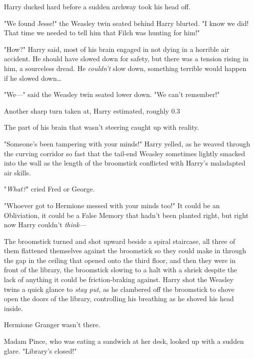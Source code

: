 Harry ducked hard before a sudden archway took his head off.

"We found Jesse!" the Weasley twin seated behind Harry blurted. "I know we did! That time we needed to tell him that Filch was hunting for him!"

"How?" Harry said, most of his brain engaged in not dying in a horrible air accident. He should have slowed down for safety, but there was a tension rising in him, a sourceless dread. He \emph{couldn't} slow down, something terrible would happen if he slowed down{\ldots}

"We---" said the Weasley twin seated lower down. "We can't remember!"

Another sharp turn taken at, Harry estimated, roughly 0.3%

The part of his brain that wasn't steering caught up with reality.

"Someone's been tampering with your minds!" Harry yelled, as he weaved through the curving corridor so fast that the tail-end Weasley sometimes lightly smacked into the wall as the length of the broomstick conflicted with Harry's maladapted air skills.

"\emph{What?}" cried Fred or George.

"Whoever got to Hermione messed with your minds too!" It could be an Obliviation, it could be a False Memory that hadn't been planted right, but right now Harry couldn't \emph{think---}

The broomstick turned and shot upward beside a spiral staircase, all three of them flattened themselves against the broomstick so they could make in through the gap in the ceiling that opened onto the third floor, and then they were in front of the library, the broomstick slowing to a halt with a shriek despite the lack of anything it could be friction-braking against. Harry shot the Weasley twins a quick glance to \emph{stay put}, as he clambered off the broomstick to shove open the doors of the library, controlling his breathing as he shoved his head inside.

Hermione Granger wasn't there.

Madam Pince, who was eating a sandwich at her desk, looked up with a sudden glare. "Library's closed!"

